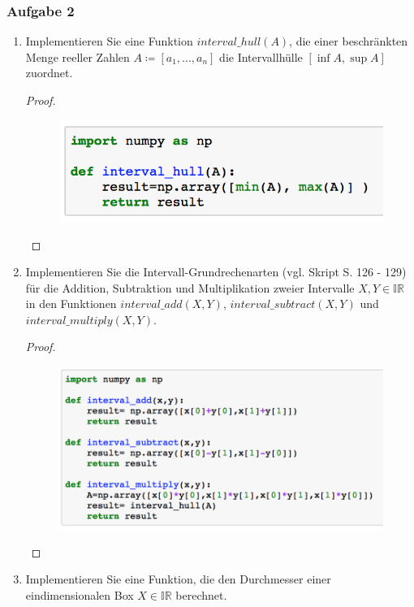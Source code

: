 \documentclass[12pt]{extreport} %
\begin{document}
\newpage

\subsubsection*{Aufgabe 2}

\begin{enumerate}
	\item Implementieren Sie eine Funktion $interval\_hull(A)$, die einer beschränkten Menge reeller Zahlen $A \coloneqq [a_1, . . . , a_n]$ die Intervallhülle $[\inf A, \sup A]$ zuordnet.
		\begin{proof} ~\
			\begin{figure}[h!] \centering
				\includegraphics[scale=0.75]{img/su2ii-i}
			\end{figure}
		\end{proof}
	\item Implementieren Sie die Intervall-Grundrechenarten (vgl. Skript S. 126 - 129) für die Addition, Subtraktion und Multiplikation zweier Intervalle $X, Y \in \mathbb{IR}$ in den Funktionen $interval\_add(X,Y)$, $interval\_subtract(X,Y)$ und   $interval\_multiply(X,Y)$.
		\begin{proof} ~\
			\begin{figure}[h!] \centering
				\includegraphics[scale=0.75]{img/su2ii-ii}
			\end{figure}
		\end{proof} \newpage
	\item Implementieren Sie eine Funktion, die den Durchmesser einer eindimensionalen Box $X \in \mathbb{IR}$ berechnet.

\end{enumerate}
\end{document}
